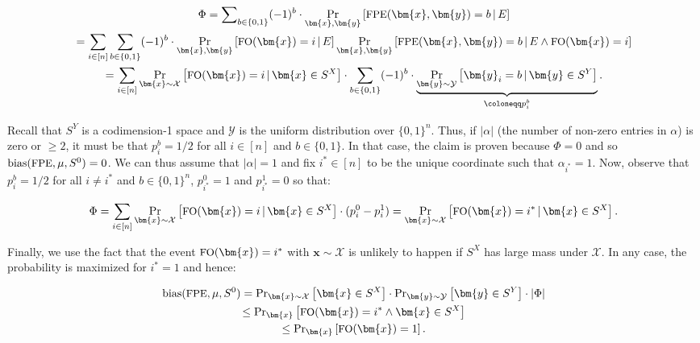 \documentclass[10pt,a4paper]{article}
\begin{document}
\[\begin{gathered}
\displaystyle\Phi \displaystyle=\sum\nolimits_{b\in\{0,1\}}(-1)^{b}\cdot\Pr_{\bm{x},\bm{y}}\left[{\textrm{\small{FPE}}}(\bm{x},\bm{y})=b\,|\,E\right] \\
\displaystyle=\sum_{i\in[n]}\sum_{b\in\{0,1\}}(-1)^{b}\cdot\Pr_{\bm{x},\bm{y}}\left[{\textrm{\small{FO}}}(\bm{x})=i\,|\,E\right]\Pr_{\bm{x},\bm{y}}\left[{\textrm{\small{FPE}}}(\bm{x},\bm{y})=b\,|\,E\wedge{\textrm{\small{FO}}}(\bm{x})=i\right] \\
\displaystyle=\sum_{i\in[n]}\Pr_{\bm{x}\sim\mathcal{X}}\left[{\textrm{\small{FO}}}(\bm{x})=i\,|\,\bm{x}\in S^{X}\right]\cdot\sum_{b\in\{0,1\}}(-1)^{b}\cdot\underbrace{\Pr_{\bm{y}\sim\mathcal{Y}}\left[\bm{y}_{i}=b\,|\,\bm{y}\in S^{Y}\right]}_{\coloneqq p_{i}^{b}}.
\end{gathered}\]


Recall that $S^{Y}$ is a codimension-1 space and $\mathcal{Y}$ is the uniform distribution over $\{0,1\}^{n}$. Thus, if $|\alpha|$ (the number of non-zero entries in $\alpha$) is zero or $\geq 2$, it must be that $p_{i}^{b}=1/2$ for all $i\in[n]$ and $b\in\{0,1\}$. In that case, the claim is proven because $\Phi=0$ and so ${\textup{bias}}({\textrm{\small{FPE}}},\mu,S^{0})=0$. We can thus assume that $|\alpha|=1$ and fix $i^{*}\in[n]$ to be the unique coordinate such that $\alpha_{i^{*}}=1$. Now, observe that $p_{i}^{b}=1/2$ for all $i\neq i^{*}$ and $b\in\{0,1\}^{n}$, $p_{i^{*}}^{0}=1$ and $p_{i^{*}}^{1}=0$ so that:\par


\[\begin{gathered}
\Phi=\sum_{i\in[n]}\Pr_{\bm{x}\sim\mathcal{X}}\left[{\textrm{\small{FO}}}(\bm{x})=i\,|\,\bm{x}\in S^{X}\right]\cdot(p_{i}^{0}-p_{i}^{1})=\Pr_{\bm{x}\sim\mathcal{X}}\left[{\textrm{\small{FO}}}(\bm{x})=i^{*}\,|\,\bm{x}\in S^{X}\right].
\end{gathered}\]


Finally, we use the fact that the event ${\textrm{\small{FO}}}(\bm{x})=i^{*}$ with $\bm{x}\sim\mathcal{X}$ is unlikely to happen if $S^{X}$ has large mass under $\mathcal{X}$. In any case, the probability is maximized for $i^{*}=1$ and hence:\par


\[\begin{gathered}
\displaystyle{\textup{bias}}({\textrm{\small{FPE}}},\mu,S^{0}) \displaystyle=\Pr\nolimits_{\bm{x}\sim\mathcal{X}}\left[\bm{x}\in S^{X}\right]\cdot\Pr\nolimits_{\bm{y}\sim\mathcal{Y}}\left[\bm{y}\in S^{Y}\right]\cdot|\Phi| \\
\displaystyle\leq\Pr\nolimits_{\bm{x}}\left[{\textrm{\small{FO}}}(\bm{x})=i^{*}\wedge\bm{x}\in S^{X}\right] \\
\displaystyle\leq\Pr\nolimits_{\bm{x}}\left[{\textrm{\small{FO}}}(\bm{x})=1\right].
\end{gathered}\]
\end{document}
